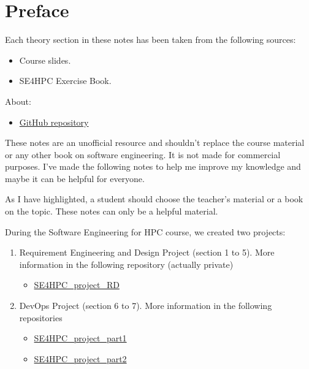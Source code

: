 \section*{Preface}

Each theory section in these notes has been taken from the following sources:
\begin{itemize}
    \item Course slides.\cite{slides}
    \item SE4HPC Exercise Book.\cite{exerciseBook}
\end{itemize}
About:
\begin{itemize}
    \item[\faIcon{github}] \href{https://github.com/PoliMI-HPC-E-notes-projects-AndreVale69/HPC-E-PoliMI-university-notes}{GitHub repository}
\end{itemize}
These notes are an unofficial resource and shouldn't replace the course material or any other book on software engineering. It is not made for commercial purposes. I've made the following notes to help me improve my knowledge and maybe it can be helpful for everyone.

As I have highlighted, a student should choose the teacher's material or a book on the topic. These notes can only be a helpful material.

\highspace
During the Software Engineering for HPC course, we created two projects:
\begin{enumerate}
    \item Requirement Engineering and Design Project (section 1 to 5). More information in the following repository (actually private)
    \begin{itemize}
        \item {} \href{https://github.com/PoliMI-HPC-E-notes-projects-AndreVale69/SE4HPC_project_RD}{SE4HPC\_project\_RD}
    \end{itemize}
    
    \item DevOps Project (section 6 to 7). More information in the following repositories
    \begin{itemize}
        \item {} \href{https://github.com/AndreVale69/SE4HPC_project_part1}{SE4HPC\_project\_part1}

        \item {} \href{https://github.com/AndreVale69/SE4HPC_project_part2}{SE4HPC\_project\_part2}
    \end{itemize}
\end{enumerate}